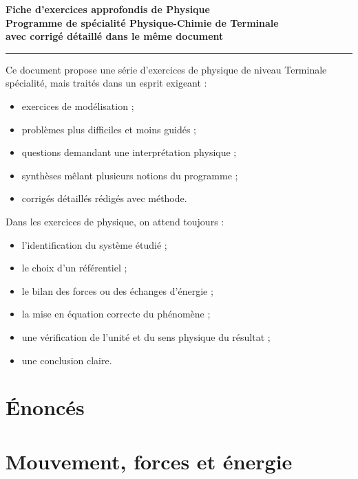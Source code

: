 \documentclass[11pt,a4paper]{article}
\begin{document}
\begin{center}
{\LARGE \textbf{Fiche d'exercices approfondis de Physique}}\\[0.3em]
{\large \textbf{Programme de spécialité Physique-Chimie de Terminale}}\\[0.4em]
{\large \textbf{avec corrigé détaillé dans le même document}}\\[0.5em]
\rule{0.92\linewidth}{0.7pt}
\end{center}

\begin{objectifbox}
Ce document propose une série d'exercices de physique de niveau Terminale spécialité, mais traités dans un esprit exigeant :
\begin{itemize}[itemsep=0.2em]
    \item exercices de modélisation ;
    \item problèmes plus difficiles et moins guidés ;
    \item questions demandant une interprétation physique ;
    \item synthèses mêlant plusieurs notions du programme ;
    \item corrigés détaillés rédigés avec méthode.
\end{itemize}
\end{objectifbox}

\begin{methodebox}
Dans les exercices de physique, on attend toujours :
\begin{itemize}[itemsep=0.2em]
    \item l'identification du système étudié ;
    \item le choix d'un référentiel ;
    \item le bilan des forces ou des échanges d'énergie ;
    \item la mise en équation correcte du phénomène ;
    \item une vérification de l'unité et du sens physique du résultat ;
    \item une conclusion claire.
\end{itemize}
\end{methodebox}

\tableofcontents

\newpage

\section{Énoncés}

\section{Mouvement, forces et énergie}
\end{document}
